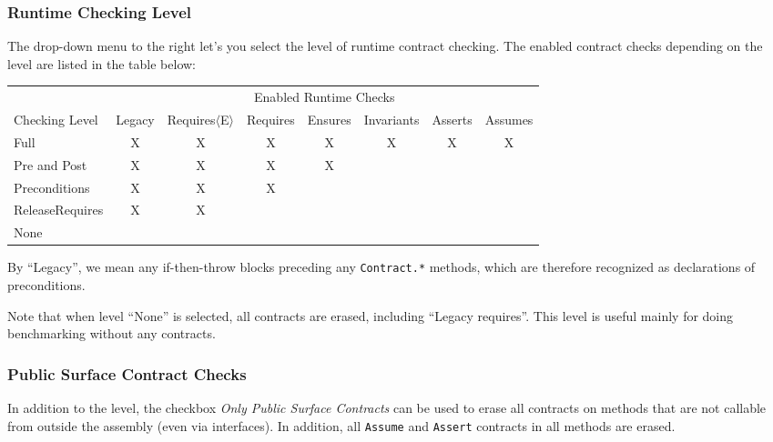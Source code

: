 \documentclass{article}
\newcommand{\code}[1]{\lstinline{#1}}
\newcommand{\requiresn}[1]{{Requires}$\langle$#1$\rangle$}
\begin{document}
\subsubsection{Runtime Checking Level}
 The drop-down menu to the right let's you select the level
of runtime contract checking. The enabled contract checks depending on
the level are listed in the
table below:
\begin{center}
\begin{tabular}{|l|c|c|c|c|c|c|c|}
\hline
& \multicolumn{7}{|c|}{Enabled Runtime Checks} \\
Checking Level & Legacy & \requiresn{E} & Requires & Ensures & Invariants & Asserts & Assumes
\\
\hline
\hline
Full           & X      & X              & X        & X       & X          & X\footnotemark[1]       & X\footnotemark[1]
\\
\hline
Pre and Post   & X      & X              & X        & X       &            &         &
\\
\hline
Preconditions  & X      & X              & X        &         &            &         &
\\
\hline
ReleaseRequires & X      & X              &          &         &            &         &
\\
\hline
None           &        &                &          &         &            &         &
\\
\hline
\end{tabular}
\end{center}

\noindent By ``Legacy'', we mean any if-then-throw blocks preceding any
\code{Contract.*} methods, which are therefore recognized as
declarations of preconditions.

Note that when level ``None'' is selected, all contracts are erased,
including ``Legacy requires''. This level is useful mainly for
doing benchmarking without any contracts.


\subsubsection{Public Surface Contract Checks}
In addition to the level, the checkbox \emph{Only Public Surface
  Contracts} can be used to erase all contracts on methods that are
not callable from outside the assembly (even via interfaces). In
addition, all \code{Assume} and \code{Assert} contracts in all methods
are erased.
\end{document}
